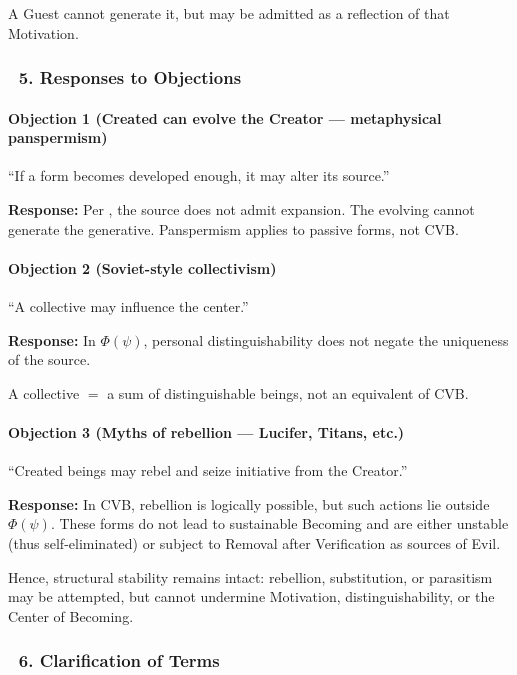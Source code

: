\documentclass[12pt]{article}
\begin{document}
A Guest cannot generate it, but may be admitted as a reflection of that Motivation.

\subsubsection*{🔹 5. Responses to Objections}

\paragraph{Objection 1 (Created can evolve the Creator — metaphysical panspermism)}

``If a form becomes developed enough, it may alter its source.''

\textbf{Response:} Per \text{[13]}, the source does not admit expansion. The evolving cannot generate the generative. Panspermism applies to passive forms, not CVB.

\bigskip

\paragraph{Objection 2 (Soviet-style collectivism)}

``A collective may influence the center.''

\textbf{Response:} In $\Phi(\psi)$, personal distinguishability does not negate the uniqueness of the source.

A collective $=$ a sum of distinguishable beings, not an equivalent of CVB.

\bigskip

\paragraph{Objection 3 (Myths of rebellion — Lucifer, Titans, etc.)}

``Created beings may rebel and seize initiative from the Creator.''

\textbf{Response:}
In CVB, rebellion is logically possible, but such actions lie outside $\Phi(\psi)$. These forms do not lead to sustainable Becoming and are either unstable (thus self-eliminated) or subject to Removal after Verification as sources of Evil.

Hence, structural stability remains intact: rebellion, substitution, or parasitism may be attempted, but cannot undermine Motivation, distinguishability, or the Center of Becoming.

\subsubsection*{🔹 6. Clarification of Terms}
\end{document}
